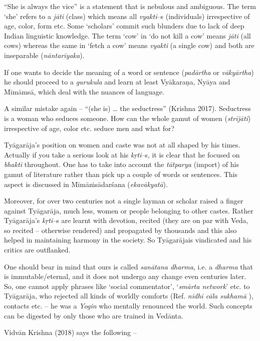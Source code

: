 “She is always the vice” is a statement that is nebulous and ambiguous. The term ‘she’ refers to a \textit{jāti} (class) which means all \textit{vyakti}–s (individuals) irrespective of age, color, form etc. Some ‘scholars’ commit such blunders due to lack of deep Indian linguistic knowledge. The term ‘cow’ in ‘do not kill a cow’ means \textit{jāti} (all cows) whereas the same in ‘fetch a cow’ means \textit{vyakti} (a single cow) and both are inseparable (\textit{nāntarīyaka}). 

If one wants to decide the meaning of a word or sentence (\textit{padārtha} or \textit{vākyārtha}) he should proceed to a \textit{gurukula} and learn at least Vyākaraṇa, Nyāya and Mīmāmsā, which deal with the nuances of language. 

A similar mistake again – “(she is) … the seductress” (Krishna 2017). Seductress is a woman who seduces someone. How can the whole gamut of women (\textit{strījāti}) irrespective of age, color etc. seduce men and what for? 

Tyāgarāja’s position on women and caste was not at all shaped by his times. Actually if you take a serious look at his \textit{kṛti}–s, it is clear that he focused on \textit{bhakti} throughout. One has to take into account the \textit{tātparya} (import) of his gamut of literature rather than pick up a couple of words or sentences. This aspect is discussed in Mīmāṁsādarśana (\textit{ekavākyatā}). 

Moreover, for over two centuries not a single layman or scholar raised a finger against Tyāgarāja, much less, women or people belonging to other castes. Rather Tyāgarāja’s \textit{kṛti}–s are learnt with devotion, recited (they are on par with Veda, so recited – otherwise rendered) and propagated by thousands and this also helped in maintaining harmony in the society. So Tyāgarājais vindicated and his critics are outflanked. 

\newpage

One should bear in mind that ours is called \textit{sanātana dharma}, i.e. a \textit{dharma} that is immutable/eternal, and it does not undergo any change even centuries later. So, one cannot apply phrases like ‘social commentator’, ‘\textit{smārta network}’ etc. to Tyāgarāja, who rejected all kinds of worldly comforts (Ref. \textit{nidhi cāla sukhamā} ), contacts etc. – he was a \textit{Yogin} who mentally renounced the world. Such concepts can be digested by only those who are trained in Vedānta.

Vidvān Krishna (2018) says the following –


